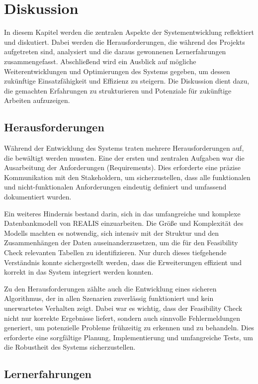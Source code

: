 \chapter{Diskussion}
In diesem Kapitel werden die zentralen Aspekte der Systementwicklung reflektiert und diskutiert. Dabei werden die Herausforderungen, die während des Projekts aufgetreten sind, analysiert und die daraus gewonnenen Lernerfahrungen zusammengefasst. Abschließend wird ein Ausblick auf mögliche Weiterentwicklungen und Optimierungen des Systems gegeben, um dessen zukünftige Einsatzfähigkeit und Effizienz zu steigern. Die Diskussion dient dazu, die gemachten Erfahrungen zu strukturieren und Potenziale für zukünftige Arbeiten aufzuzeigen.
\section{Herausforderungen}

Während der Entwicklung des Systems traten mehrere Herausforderungen auf, die bewältigt werden mussten. Eine der ersten und zentralen Aufgaben war die Ausarbeitung der Anforderungen (Requirements). Dies erforderte eine präzise Kommunikation mit den Stakeholdern, um sicherzustellen, dass alle funktionalen und nicht-funktionalen Anforderungen eindeutig definiert und umfassend dokumentiert wurden. 

Ein weiteres Hindernis bestand darin, sich in das umfangreiche und komplexe Datenbankmodell von \gls{REALIS} einzuarbeiten. Die Größe und Komplexität des Modells machten es notwendig, sich intensiv mit der Struktur und den Zusammenhängen der Daten auseinanderzusetzen, um die für den Feasibility Check relevanten Tabellen zu identifizieren. Nur durch dieses tiefgehende Verständnis konnte sichergestellt werden, dass die Erweiterungen effizient und korrekt in das System integriert werden konnten.

Zu den Herausforderungen zählte auch die Entwicklung eines sicheren Algorithmus, der in allen Szenarien zuverlässig funktioniert und kein unerwartetes Verhalten zeigt. Dabei war es wichtig, dass der Feasibility Check nicht nur korrekte Ergebnisse liefert, sondern auch sinnvolle Fehlermeldungen generiert, um potenzielle Probleme frühzeitig zu erkennen und zu behandeln. Dies erforderte eine sorgfältige Planung, Implementierung und umfangreiche Tests, um die Robustheit des Systems sicherzustellen.

\section{Lernerfahrungen}

